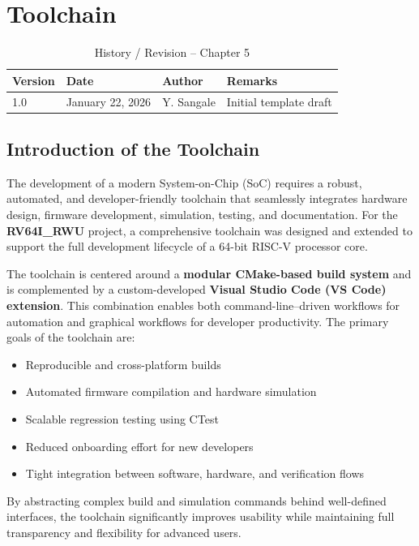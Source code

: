\chapter{Toolchain}
\label{chap:toolchain}

\begin{table}[H]
\caption{History / Revision – Chapter 5}
\label{tab:history-ch1}
\centering
\begin{tabular}{llll}
\toprule
Version & Date & Author & Remarks \\
\midrule
1.0 & January 22, 2026 & Y. Sangale & Initial template draft \\
\bottomrule
\end{tabular}
\end{table}

\section{Introduction of the Toolchain}


The development of a modern System-on-Chip (SoC) requires a robust, automated, and developer-friendly toolchain that seamlessly integrates hardware design, firmware development, simulation, testing, and documentation.  
For the \textbf{RV64I\_RWU} project, a comprehensive toolchain was designed and extended to support the full development lifecycle of a 64-bit RISC-V processor core.

The toolchain is centered around a \textbf{modular CMake-based build system} and is complemented by a custom-developed \textbf{Visual Studio Code (VS Code) extension}.  
This combination enables both command-line–driven workflows for automation and graphical workflows for developer productivity. The primary goals of the toolchain are:

\begin{itemize}
    \item Reproducible and cross-platform builds
    \item Automated firmware compilation and hardware simulation
    \item Scalable regression testing using CTest
    \item Reduced onboarding effort for new developers
    \item Tight integration between software, hardware, and verification flows
\end{itemize}

By abstracting complex build and simulation commands behind well-defined interfaces, the toolchain significantly improves usability while maintaining full transparency and flexibility for advanced users.

